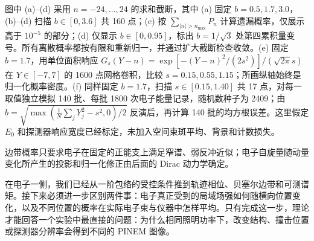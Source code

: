 图中 (a)--(d) 采用 $n=-24,\ldots,24$ 的求和截断，其中 (a) 固定 $b=0.5,1.7,3.0$，(b)--(d) 扫描 $b\in[0,3.6]$ 共 160 点；(c) 按 $\sum_{|n|>n_{\max}}P_n$ 计算遗漏概率，仅展示高于 $10^{-5}$ 的部分；(d) 仅显示 $b\in[0,0.95]$，标出 $b=1/\sqrt3$ 处第四累积量变号。所有离散概率都按有限和重新归一，并通过扩大截断检查收敛。(e) 固定 $b=1.7$，用单位面积响应 $G_s(Y-n)=\exp[-(Y-n)^2/(2s^2)]/(\sqrt{2\pi}s)$ 在 $Y\in[-7,7]$ 的 1600 点网格卷积，比较 $s=0.15,0.55,1.15$；所画纵轴始终是归一化概率密度。(f) 同样固定 $b=1.7$，扫描 $s\in[0.15,1.40]$ 共 17 点，对每一取值独立模拟 140 批、每批 1800 次电子能量记录，随机数种子为 2409；由 $\widehat b=\sqrt{\max(\frac1N\sum_jY_j^2-s^2,0)/2}$ 反演后，再计算 140 批的均方根误差。这里假定 $E_0$ 和探测器响应宽度已经标定，未加入空间束斑平均、背景和计数损失。


边带概率只要求电子在固定的正能支上满足窄谱、弱反冲近似；电子自旋量随动量变化所产生的投影和归一化修正由后面的 Dirac 动力学确定。


在电子一侧，我们已经从一阶包络的受控条件推到轨迹相位、贝塞尔边带和可测谱矩。接下来必须进一步区别两件事：电子真正受到的局域场强如何随横向位置变化，以及不同位置的概率在实际电子束与仪器中怎样平均。只有完成这一步，理论才能回答一个实验中最直接的问题：为什么相同照明功率下，改变结构、撞击位置或探测器分辨率会得到不同的 PINEM 图像。
